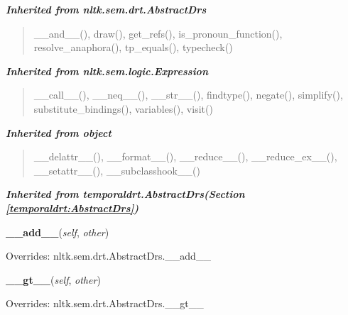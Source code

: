 \large{\textbf{\textit{Inherited from nltk.sem.drt.AbstractDrs}}}

\begin{quote}
\_\_and\_\_(), draw(), get\_refs(), is\_pronoun\_function(), resolve\_anaphora(), tp\_equals(), typecheck()
\end{quote}

\large{\textbf{\textit{Inherited from nltk.sem.logic.Expression}}}

\begin{quote}
\_\_call\_\_(), \_\_neq\_\_(), \_\_str\_\_(), findtype(), negate(), simplify(), substitute\_bindings(), variables(), visit()
\end{quote}

\large{\textbf{\textit{Inherited from object}}}

\begin{quote}
\_\_delattr\_\_(), \_\_format\_\_(), \_\_reduce\_\_(), \_\_reduce\_ex\_\_(), \_\_setattr\_\_(), \_\_subclasshook\_\_()
\end{quote}

\large{\textbf{\textit{Inherited from temporaldrt.AbstractDrs\textit{(Section \ref{temporaldrt:AbstractDrs})}}}}

    \vspace{0.5ex}

\hspace{.8\funcindent}\begin{boxedminipage}{\funcwidth}

    \raggedright \textbf{\_\_add\_\_}(\textit{self}, \textit{other})

\setlength{\parskip}{2ex}
\setlength{\parskip}{1ex}
      Overrides: nltk.sem.drt.AbstractDrs.\_\_add\_\_

    \end{boxedminipage}

    \vspace{0.5ex}

\hspace{.8\funcindent}\begin{boxedminipage}{\funcwidth}

    \raggedright \textbf{\_\_gt\_\_}(\textit{self}, \textit{other})

\setlength{\parskip}{2ex}
\setlength{\parskip}{1ex}
      Overrides: nltk.sem.drt.AbstractDrs.\_\_gt\_\_

    \end{boxedminipage}

    \vspace{0.5ex}

